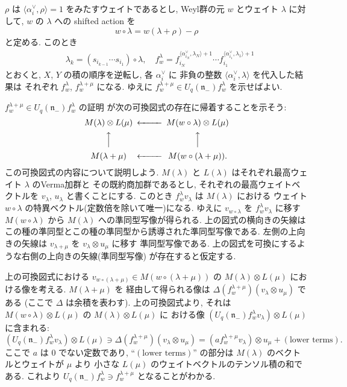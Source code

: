 \documentclass[12pt,twoside,dvipdfm]{msjproc}
\theoremstyle{definition} %
\theoremstyle{definition} %
\theoremstyle{definition} %
\numberwithin{theorem}{section}
\numberwithin{equation}{section}
\numberwithin{figure}{section}
\numberwithin{table}{section}
\newcommand\nil{\mathfrak{n}}
\newcommand\bra{\langle}
\newcommand\ket{\rangle}
\newcommand\av{\alpha^\vee}
\begin{document}
$\rho$ は $\bra\av_i,\rho\ket=1$ をみたすウェイトであるとし, 
Weyl群の元 $w$ とウェイト $\lambda$ に対して, 
$w$ の $\lambda$ への shifted action を
\begin{equation*}
 w\circ\lambda = w(\lambda+\rho)-\rho
\end{equation*}
と定める. このとき 
\begin{align*}
  &
  \lambda_k = (s_{i_{k-1}}\cdots s_{i_1})\circ\lambda,
\quad
  f^\lambda_w = f_{i_N}^{\bra\av_{i_N},\lambda_N\ket+1}
         \cdots f_{i_1}^{\bra\av_{i_1},\lambda_1\ket+1}
\end{align*}
とおくと, $X$, $Y$ の積の順序を逆転し, 各 $\av_i$ に
非負の整数 $\bra\av_i,\lambda\ket$ を代入した結果は
それぞれ $f^\lambda_w$, $f^{\lambda+\mu}_w$ になる.
ゆえに $f^{\lambda+\mu}_w \in U_q(\nil_-)f^\lambda_w$ を示せばよい.

$f^{\lambda+\mu}_w \in U_q(\nil_-)f^\lambda_w$ の証明
が次の可換図式の存在に帰着することを示そう:
\begin{equation*}
\begin{CD}
  M(\lambda)\otimes L(\mu) @<<< M(w\circ\lambda)\otimes L(\mu) \\
  @AAA                          @AAA \\
  M(\lambda+\mu)           @<<< M(w\circ(\lambda+\mu)). \\
\end{CD}
\end{equation*}
この可換図式の内容について説明しよう.
$M(\lambda)$ と $L(\lambda)$ はそれぞれ最高ウェイト $\lambda$ のVerma加群と
その既約商加群であるとし, それぞれの最高ウェイトベクトルを $v_\lambda$, $u_\lambda$
と書くことにする.  このとき $f^\lambda_w v_\lambda$ は $M(\lambda)$ における
ウェイト $w\circ\lambda$ の特異ベクトル(定数倍を除いて唯一)になる.  
ゆえに $v_{w\circ\lambda}$ を $f^\lambda_w v_\lambda$ に移す $M(w\circ\lambda)$ 
から $M(\lambda)$ への準同型写像が得られる. 上の図式の横向きの矢線は
この種の準同型とこの種の準同型から誘導された準同型写像である. 
左側の上向きの矢線は $v_{\lambda+\mu}$ を $v_\lambda\otimes u_\mu$ に移す
準同型写像である.  上の図式を可換にするような右側の上向きの矢線(準同型写像)
が存在すると仮定する.

上の可換図式における $v_{w\circ(\lambda+\mu)}\in M(w\circ(\lambda+\mu))$ 
の $M(\lambda)\otimes L(\mu)$ における像を考える.  $M(\lambda+\mu)$ を
経由して得られる像は $\Delta(f^{\lambda+\mu}_w)(v_\lambda\otimes u_\mu)$ である
(ここで $\Delta$ は余積を表わす).  上の可換図式より, 
それは $M(w\circ\lambda)\otimes L(\mu)$ の $M(\lambda)\otimes L(\mu)$ に
おける像 $(U_q(\nil_-)f^\lambda_w v_\lambda)\otimes L(\mu)$ に含まれる:
\begin{equation*}
 (U_q(\nil_-)f^\lambda_w v_\lambda)\otimes L(\mu) \ni
 \Delta(f^{\lambda+\mu}_w)(v_\lambda\otimes u_\mu)
 = (a f^{\lambda+\mu}_w v_\lambda)\otimes u_\mu + (\text{lower terms}).
\end{equation*}
ここで $a$ は $0$ でない定数であり, 
``$(\text{lower terms})$'' の部分は $M(\lambda)$ のベクトルとウェイトが $\mu$ より
小さな $L(\mu)$ のウェイトベクトルのテンソル積の和である.
これより $U_q(\nil_-)f^\lambda_w \ni f^{\lambda+\mu}_w$ となることがわかる.
\end{document}

